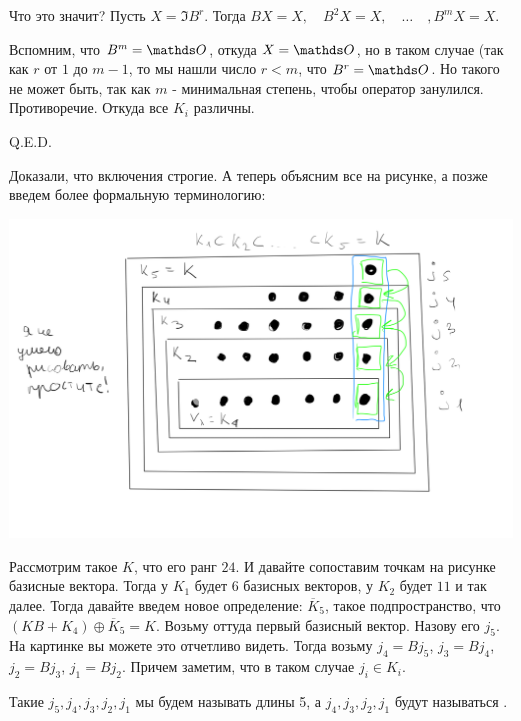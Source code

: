 Что это значит?  Пусть $X = \Im B^r$. Тогда $BX = X,\quad B^2X = X, \quad \ldots \quad, B^mX=X $.

Вспомним, что $B^m = \zero$, откуда $X = \zero$, но в таком случае (так как $r$ от $1$ до $m-1$, то мы нашли число $r<m$, что $B^r=\zero$. Но такого не может быть, так как $m$ - минимальная степень, чтобы оператор занулился. Противоречие. Откуда все $K_i$ различны.

\hfill Q.E.D.

Доказали, что включения строгие. А теперь объясним все на рисунке, а позже введем более формальную терминологию:

\begin{center}
   \includegraphics[width = 15cm]{assets/7_9-zhordan-sample.png}
\end{center}

Рассмотрим такое $K$, что его ранг $24$. И давайте  сопоставим точкам на рисунке базисные вектора. Тогда у $K_1$ будет $6$ базисных векторов, у $K_2$ будет $11$ и так далее. Тогда давайте введем новое определение: $\overline{K}_5$, такое подпространство, что $(KB + K_4) \oplus \overline{K}_5 = K$. Возьму оттуда первый базисный вектор. Назову его $j_5$. На картинке вы можете это отчетливо видеть. Тогда возьму $j_4 =Bj_5$, $j_3 =Bj_4$, $j_2 =Bj_3$, $j_1 =Bj_2$. Причем заметим, что в таком случае $j_i \in K_i$. 

Такие $j_5,j_4,j_3,j_2,j_1$ мы будем называть  длины 5, а $j_4,j_3,j_2,j_1$ будут называться .

